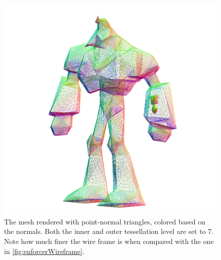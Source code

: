 \documentclass[a4paper,10pt]{article}
\begin{document}
\begin{figure}
	\includegraphics[width=\textwidth]{enforcer_normals_pn_i7_o7.png}
	\caption{The mesh rendered with point-normal triangles, colored based on the normals. Both the inner and outer tessellation level are set to 7. Note how much finer the wire frame is when compared with the one in \cref{fig:enforcerWireframe}.}		
	\label{fig:enforcerNormals7}	
\end{figure}
\end{document}
